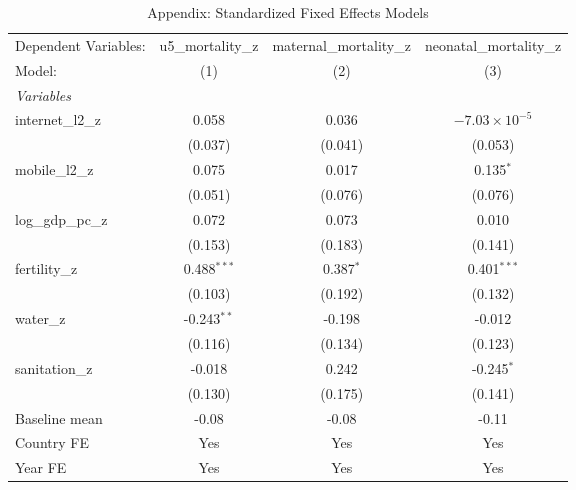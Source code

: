 \begin{table}[htbp]
   \caption{\label{tab:appendix_standardized} Appendix: Standardized Fixed Effects Models}
   \centering
   \begin{tabular}{lccc}
      \tabularnewline \midrule \midrule
      Dependent Variables: & u5\_mortality\_z   & maternal\_mortality\_z   & neonatal\_mortality\_z\\    
      Model:               & (1)                & (2)                      & (3)\\  
      \midrule
      \emph{Variables}\\
      internet\_l2\_z      & 0.058              & 0.036                    & $-7.03\times 10^{-5}$\\    
                           & (0.037)            & (0.041)                  & (0.053)\\   
      mobile\_l2\_z        & 0.075              & 0.017                    & 0.135$^{*}$\\   
                           & (0.051)            & (0.076)                  & (0.076)\\   
      log\_gdp\_pc\_z      & 0.072              & 0.073                    & 0.010\\   
                           & (0.153)            & (0.183)                  & (0.141)\\   
      fertility\_z         & 0.488$^{***}$      & 0.387$^{*}$              & 0.401$^{***}$\\   
                           & (0.103)            & (0.192)                  & (0.132)\\   
      water\_z             & -0.243$^{**}$      & -0.198                   & -0.012\\   
                           & (0.116)            & (0.134)                  & (0.123)\\   
      sanitation\_z        & -0.018             & 0.242                    & -0.245$^{*}$\\   
                           & (0.130)            & (0.175)                  & (0.141)\\   
      Baseline mean        & -0.08              & -0.08                    & -0.11\\  
      Country FE           & Yes                & Yes                      & Yes\\  
      Year FE              & Yes                & Yes                      & Yes\\  
      \midrule

\end{tabular}
\end{table}
